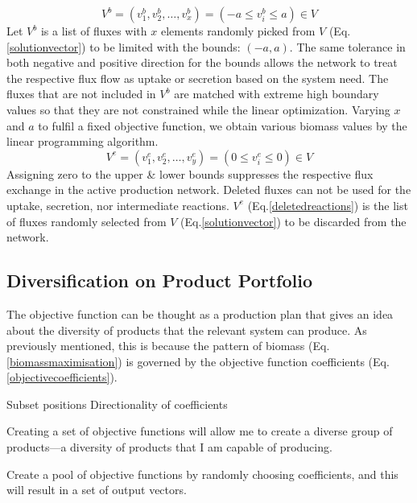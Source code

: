 \begin{equation} \tag{6}
	V^{b}=(v^{b}_{1}, v^{b}_{2},\dots, v^{b}_{x})= (-a\le v^{b}_{i}\le a)\in V
	\label{constrainedfluxlist}
\end{equation}
Let $V^{b}$ is a list of fluxes with $x$ elements randomly picked from $V$ (Eq.\eqref{solutionvector}) to be limited with the bounds: $(-a, a)$. The same tolerance in both negative and positive direction for the bounds allows the network to treat the respective flux flow as uptake or secretion based on the system need. The fluxes that are not included in $V^{b}$ are matched with extreme high boundary values so that they are not constrained while the linear optimization. Varying $x$ and $a$ to fulfil a fixed objective function, we obtain various biomass values by the linear programming algorithm.
\begin{equation} \tag{7}
	V^{e}=(v^{e}_{1}, v^{e}_{2},\dots, v^{e}_{y})= (0\le v^{e}_{i}\le 0)\in V
	\label{deletedreactions}
\end{equation}
Assigning zero to the upper \& lower bounds suppresses the respective flux exchange in the active production network. Deleted fluxes can not be used for the uptake, secretion, nor intermediate reactions. $V^{e}$ (Eq.\eqref{deletedreactions}) is the list of fluxes randomly selected from $V$ (Eq.\eqref{solutionvector}) to be discarded from the network.

\subsection*{Diversification on Product Portfolio}
%
The objective function can be thought as a production plan that gives an idea about the diversity of products that the relevant system can produce. As previously mentioned, this is because the pattern of biomass (Eq.\eqref{biomassmaximisation}) is governed by the objective function coefficients (Eq.\eqref{objectivecoefficients}).

Subset positions
Directionality of coefficients

Creating a set of objective functions will allow me to create a diverse group of products—a diversity of products that I am capable of producing.

Create a pool of objective functions by randomly choosing coefficients, and this will result in a set of output vectors.


